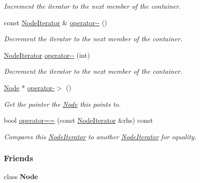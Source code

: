 \begin{DoxyCompactItemize}
\begin{DoxyCompactList}\small\item\em Increment the iterator to the next member of the container. \item\end{DoxyCompactList}\item 
const \hyperlink{classphys_1_1xml_1_1NodeIterator}{NodeIterator} \& \hyperlink{classphys_1_1xml_1_1NodeIterator_a97d315fce355d0c48322172d248a5138}{operator-\/-\/} ()
\begin{DoxyCompactList}\small\item\em Decrement the iterator to the next member of the container. \item\end{DoxyCompactList}\item 
\hyperlink{classphys_1_1xml_1_1NodeIterator}{NodeIterator} \hyperlink{classphys_1_1xml_1_1NodeIterator_a331a62c9765a66cc9659c75fb58f7ad8}{operator-\/-\/} (int)
\begin{DoxyCompactList}\small\item\em Decrement the iterator to the next member of the container. \item\end{DoxyCompactList}\item 
\hyperlink{classphys_1_1xml_1_1Node}{Node} $\ast$ \hyperlink{classphys_1_1xml_1_1NodeIterator_a32b9af9cfa38f9ffe5d9243b9c0565cb}{operator-\/$>$} ()
\begin{DoxyCompactList}\small\item\em Get the pointer the \hyperlink{classphys_1_1xml_1_1Node}{Node} this points to. \item\end{DoxyCompactList}\item 
bool \hyperlink{classphys_1_1xml_1_1NodeIterator_a5c8ad72fbdbf0ae621fb041fef422a5e}{operator==} (const \hyperlink{classphys_1_1xml_1_1NodeIterator}{NodeIterator} \&rhs) const 
\begin{DoxyCompactList}\small\item\em Compares this \hyperlink{classphys_1_1xml_1_1NodeIterator}{NodeIterator} to another \hyperlink{classphys_1_1xml_1_1NodeIterator}{NodeIterator} for equality. \item\end{DoxyCompactList}\end{DoxyCompactItemize}
\subsubsection*{Friends}
\begin{DoxyCompactItemize}
\item 
\hypertarget{classphys_1_1xml_1_1NodeIterator_a6db9d28bd448a131448276ee03de1e6d}{
class {\bfseries Node}}
\label{classphys_1_1xml_1_1NodeIterator_a6db9d28bd448a131448276ee03de1e6d}

\end{DoxyCompactItemize}


